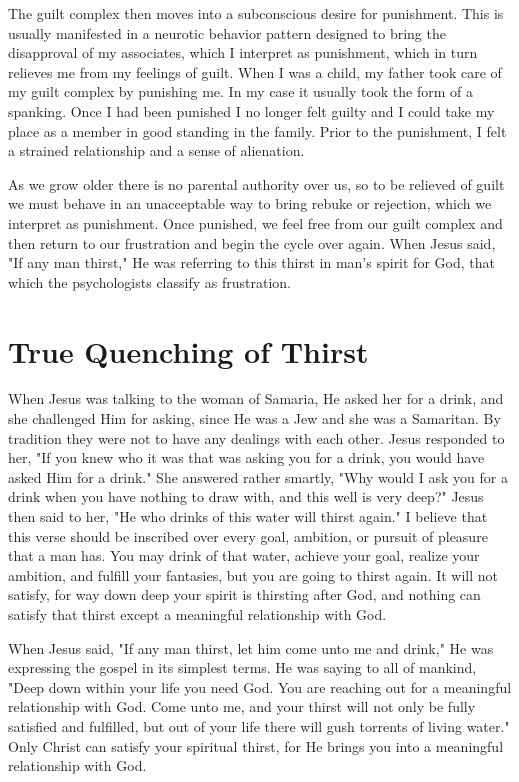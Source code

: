 The guilt complex then moves into a subconscious desire for punishment. This is usually manifested in a neurotic behavior pattern designed to bring the disapproval of my associates, which I interpret as punishment, which in turn relieves me from my feelings of guilt. When I was a child, my father took care of my guilt complex by punishing me. In my case it usually took the form of a spanking. Once I had been punished I no longer felt guilty and I could take my place as a member in good standing in the family. Prior to the punishment, I felt a strained relationship and a sense of alienation. 

As we grow older there is no parental authority over us, so to be relieved of guilt we must behave in an unacceptable way to bring rebuke or rejection, which we interpret as punishment. Once punished, we feel free from our guilt complex and then return to our frustration and begin the cycle over again. When Jesus said, "If any man thirst," He was referring to this thirst in man's spirit for God, that which the psychologists classify as frustration. 

\section*{True Quenching of Thirst}

When Jesus was talking to the woman of Samaria, He asked her for a drink, and she challenged Him for asking, since He was a Jew and she was a Samaritan. By tradition they were not to have any dealings with each other. Jesus responded to her, "If you knew who it was that was asking you for a drink, you would have asked Him for a drink." She answered rather smartly, "Why would I ask you for a drink when you have nothing to draw with, and this well is very deep?" Jesus then said to her, "He who drinks of this water will thirst again." I believe that this verse should be inscribed over every goal, ambition, or pursuit of pleasure that a man has. You may drink of that water, achieve your goal, realize your ambition, and fulfill your fantasies, but you are going to thirst again. It will not satisfy, for way down deep your spirit is thirsting after God, and nothing can satisfy that thirst except a meaningful relationship with God. 

When Jesus said, "If any man thirst, let him come unto me and drink," He was expressing the gospel in its simplest terms. He was saying to all of mankind, "Deep down within your life you need God. You are reaching out for a meaningful relationship with God. Come unto me, and your thirst will not only be fully satisfied and fulfilled, but out of your life there will gush torrents of living water." Only Christ can satisfy your spiritual thirst, for He brings you into a meaningful relationship with God. 

